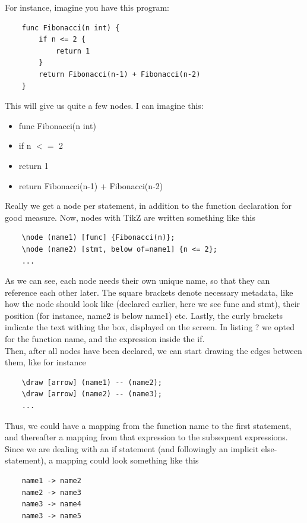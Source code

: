 For instance, imagine you have this program:

\begin{lstlisting}
    func Fibonacci(n int) {
        if n <= 2 {
            return 1
        }
        return Fibonacci(n-1) + Fibonacci(n-2)
    }
\end{lstlisting}

This will give us quite a few nodes. I can imagine this:

\begin{itemize}
    \item func Fibonacci(n int)
    \item if n $<=$ 2
    \item return 1
    \item return Fibonacci(n-1) + Fibonacci(n-2)
\end{itemize}

Really we get a node per statement, in addition to the function declaration for good measure. Now, nodes with TikZ are written something like this

\begin{lstlisting}
    \node (name1) [func] {Fibonacci(n)};
    \node (name2) [stmt, below of=name1] {n <= 2};
    ...
\end{lstlisting}

As we can see, each node needs their own unique name, so that they can reference each other later. The square brackets denote necessary metadata, like how the node should look like (declared earlier, here we see func and stmt), their position (for instance, name2 is below name1) etc. Lastly, the curly brackets indicate the text withing the box, displayed on the screen. In listing ? we opted for the function name, and the expression inside the if. \\

Then, after all nodes have been declared, we can start drawing the edges between them, like for instance

\begin{lstlisting}
    \draw [arrow] (name1) -- (name2);
    \draw [arrow] (name2) -- (name3);
    ...
\end{lstlisting}

Thus, we could have a mapping from the function name to the first statement, and thereafter a mapping from that expression to the subsequent expressions. Since we are dealing with an if statement (and followingly an implicit else-statement), a mapping could look something like this

\begin{lstlisting}
    name1 -> name2
    name2 -> name3
    name3 -> name4
    name3 -> name5
\end{lstlisting}

